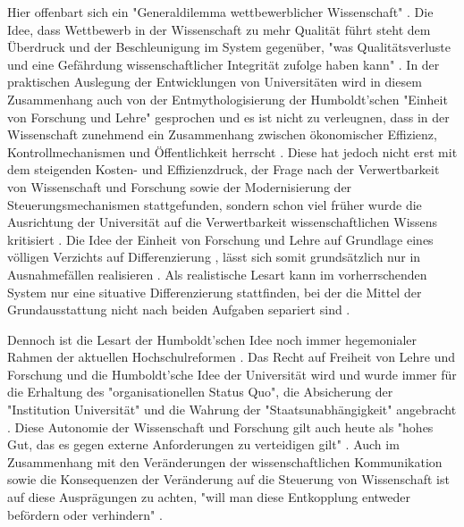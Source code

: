 Hier offenbart sich ein "Generaldilemma wettbewerblicher Wissenschaft" \cite[:37]{Wissenschaftsrat_2015}. Die Idee, dass Wettbewerb in der Wissenschaft zu mehr Qualität führt steht dem Überdruck und der Beschleunigung im System gegenüber, "was Qualitätsverluste und eine Gefährdung wissenschaftlicher Integrität zufolge haben kann" \cite[:37]{Wissenschaftsrat_2015}. In der praktischen Auslegung der Entwicklungen von Universitäten wird in diesem Zusammenhang auch von der Entmythologisierung der Humboldt’schen "Einheit von Forschung und Lehre" gesprochen \cite{Binswanger_2014} \cite[:299]{Schimank_2001} \cite[:343]{Kruecken_2001} und es ist nicht zu verleugnen, dass in der Wissenschaft zunehmend ein Zusammenhang zwischen ökonomischer Effizienz, Kontrollmechanismen und Öffentlichkeit herrscht \cite[:27]{Reinhart_2006} \cite{Foucault_1977}  \cite{Meier_2009}. Diese hat jedoch nicht erst mit dem steigenden Kosten- und Effizienzdruck, der Frage nach der Verwertbarkeit von Wissenschaft und Forschung sowie der Modernisierung der Steuerungsmechanismen stattgefunden, sondern schon viel früher wurde die Ausrichtung der Universität auf die Verwertbarkeit wissenschaftlichen Wissens kritisiert \cite{Huber_2005}. Die Idee der Einheit von Forschung und Lehre auf Grundlage eines völligen Verzichts auf Differenzierung \cite{Kittler_2004}, lässt sich somit grundsätzlich nur in Ausnahmefällen realisieren \cite{Schimank_2001}. Als realistische Lesart kann im vorherrschenden System nur eine situative Differenzierung stattfinden, bei der die Mittel der Grundausstattung nicht nach beiden Aufgaben separiert sind \cite{Schimank_2001}.

Dennoch ist die Lesart der Humboldt’schen Idee noch immer hegemonialer Rahmen der aktuellen Hochschulreformen \cite{Huber_2005}. Das Recht auf Freiheit von Lehre und Forschung und die Humboldt’sche Idee der Universität wird und wurde immer für die Erhaltung des "organisationellen Status Quo", die Absicherung der "Institution Universität" und die Wahrung der "Staatsunabhängigkeit" angebracht \cite{Huber_2005}. Diese Autonomie der Wissenschaft und Forschung gilt auch heute als "hohes Gut, das es gegen externe Anforderungen zu verteidigen gilt" \cite{Kaldewey_2010}. Auch im Zusammenhang mit den Veränderungen der wissenschaftlichen Kommunikation sowie die Konsequenzen der Veränderung auf die Steuerung von Wissenschaft ist auf diese Ausprägungen zu achten, "will man diese Entkopplung entweder befördern oder verhindern" \cite[:57]{Meier_2009}.

